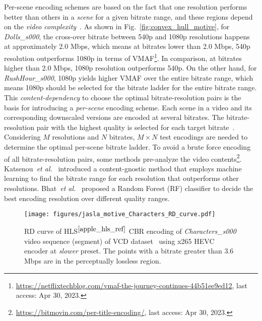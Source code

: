 \documentclass{article}
\newcommand{\etal}{\emph{et al.}\xspace}
\begin{document}
Per-scene encoding schemes are based on the fact that one resolution performs better than others in a \textit{scene} for a given bitrate range, and these regions depend on the \textit{video complexity}~\cite{jtps_ref}. As shown in Fig.~\ref{fig:convex_hull_motive}, for \textit{Dolls\_s000}, the cross-over bitrate between 540p and 1080p resolutions happens at approximately 2.0 Mbps, which means at bitrates lower than 2.0 Mbps, 540p resolution outperforms 1080p in terms of VMAF\footnote{\label{ref_vmaf}\href{https://netflixtechblog.com/vmaf-the-journey-continues-44b51ee9ed12}{https://netflixtechblog.com/vmaf-the-journey-continues-44b51ee9ed12}, last access: Apr 30, 2023.}. In comparison, at bitrates higher than 2.0 Mbps, 1080p resolution outperforms 540p. On the other hand, for \textit{RushHour\_s000}, 1080p yields higher VMAF over the entire bitrate range, which means 1080p should be selected for the bitrate ladder for the entire bitrate range. This \textit{content-dependency} to choose the optimal bitrate-resolution pairs is the basis for introducing a \textit{per-scene} encoding scheme. 
Each scene in a video and its corresponding downscaled versions are encoded at several bitrates. The bitrate-resolution pair with the highest quality is selected for each target bitrate~\cite{netflix_paper}. Considering $M$ resolutions and $N$ bitrates, $M\times N$ test encodings are needed to determine the optimal per-scene bitrate ladder. To avoid a brute force encoding of all bitrate-resolution pairs, some methods pre-analyze the video contents\footnote{\href{https://bitmovin.com/per-title-encoding/}{https://bitmovin.com/per-title-encoding/}, last access: Apr 30, 2023.}. Katsenou~\etal~\cite{gnostic} introduced a content-gnostic method that employs machine learning to find the bitrate range for each resolution that outperforms other resolutions. Bhat~\etal~\cite{res_pred_ref1} proposed a Random Forest (RF) classifier to decide the best encoding resolution over different quality ranges.

\begin{figure}[t]
\centering
\texttt{[image: figures/jasla\_motive\_Characters\_RD\_curve.pdf]}
\vspace{-0.4em}
\caption{RD curve of HLS$^{\ref{apple_hls_ref}}$ CBR encoding of \textit{Characters\_s000} video sequence (segment) of VCD dataset~\cite{VCD_ref}  using x265 HEVC encoder at \textit{slower} preset. The points with a bitrate greater than 3.6 Mbps are in the perceptually lossless region.}
\label{fig:motive}
\vspace{-0.86em}
\end{figure}
\end{document}
